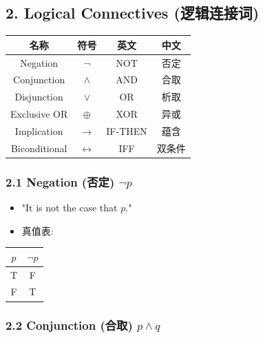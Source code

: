 \documentclass[10pt,a4paper,openany]{ctexbook}
\theoremstyle{definition}
\theoremstyle{remark}
\begin{document}
\vspace{-2pt}

\subsection{2. Logical Connectives (逻辑连接词)}

\begin{center}
\begin{tabular}{cccc}
\hline
名称 & 符号 & 英文 & 中文 \\ \hline
Negation & $\neg$ & NOT & 否定 \\
Conjunction & $\land$ & AND & 合取 \\
Disjunction & $\lor$ & OR & 析取 \\
Exclusive OR & $\oplus$ & XOR & 异或 \\
Implication & $\to$ & IF-THEN & 蕴含 \\
Biconditional & $\leftrightarrow$ & IFF & 双条件 \\
\hline
\end{tabular}

\end{center}

\vspace{-2pt}

\subsubsection{2.1 Negation (否定) $\neg p$}

\begin{itemize}
\item "It is not the case that $p$."
\item 真值表:

\end{itemize}

\begin{center}
\begin{tabular}{cc}
\hline
$p$ & $\neg p$ \\ \hline
T & F \\
F & T \\
\hline
\end{tabular}

\end{center}

\vspace{-2pt}

\subsubsection{2.2 Conjunction (合取) $p \land q$}
\end{document}
